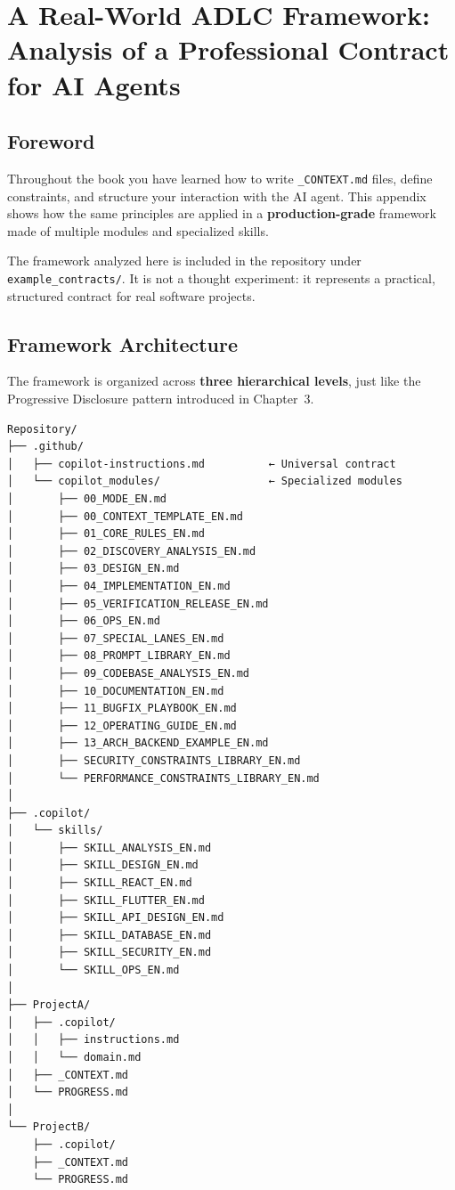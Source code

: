 \chapter{A Real-World ADLC Framework: Analysis of a Professional Contract for AI Agents}
\label{app:adlc-framework}

\section*{Foreword}

Throughout the book you have learned how to write \texttt{\_CONTEXT.md} files, define constraints, and structure your interaction with the AI agent. This appendix shows how the same principles are applied in a \textbf{production-grade} framework made of multiple modules and specialized skills.

The framework analyzed here is included in the repository under \texttt{example\_contracts/}. It is not a thought experiment: it represents a practical, structured contract for real software projects.

\section{Framework Architecture}

The framework is organized across \textbf{three hierarchical levels}, just like the Progressive Disclosure pattern introduced in Chapter~3.

\begin{lstlisting}[language={},title={Framework structure}]
Repository/
├── .github/
│   ├── copilot-instructions.md          ← Universal contract
│   └── copilot_modules/                 ← Specialized modules
│       ├── 00_MODE_EN.md
│       ├── 00_CONTEXT_TEMPLATE_EN.md
│       ├── 01_CORE_RULES_EN.md
│       ├── 02_DISCOVERY_ANALYSIS_EN.md
│       ├── 03_DESIGN_EN.md
│       ├── 04_IMPLEMENTATION_EN.md
│       ├── 05_VERIFICATION_RELEASE_EN.md
│       ├── 06_OPS_EN.md
│       ├── 07_SPECIAL_LANES_EN.md
│       ├── 08_PROMPT_LIBRARY_EN.md
│       ├── 09_CODEBASE_ANALYSIS_EN.md
│       ├── 10_DOCUMENTATION_EN.md
│       ├── 11_BUGFIX_PLAYBOOK_EN.md
│       ├── 12_OPERATING_GUIDE_EN.md
│       ├── 13_ARCH_BACKEND_EXAMPLE_EN.md
│       ├── SECURITY_CONSTRAINTS_LIBRARY_EN.md
│       └── PERFORMANCE_CONSTRAINTS_LIBRARY_EN.md
│
├── .copilot/
│   └── skills/
│       ├── SKILL_ANALYSIS_EN.md
│       ├── SKILL_DESIGN_EN.md
│       ├── SKILL_REACT_EN.md
│       ├── SKILL_FLUTTER_EN.md
│       ├── SKILL_API_DESIGN_EN.md
│       ├── SKILL_DATABASE_EN.md
│       ├── SKILL_SECURITY_EN.md
│       └── SKILL_OPS_EN.md
│
├── ProjectA/
│   ├── .copilot/
│   │   ├── instructions.md
│   │   └── domain.md
│   ├── _CONTEXT.md
│   └── PROGRESS.md
│
└── ProjectB/
    ├── .copilot/
    ├── _CONTEXT.md
    └── PROGRESS.md
\end{lstlisting}

